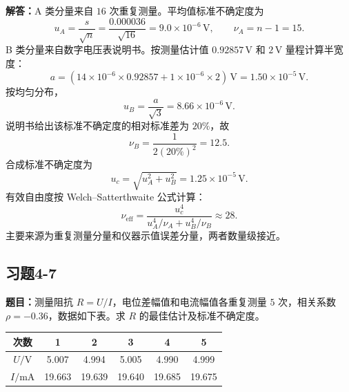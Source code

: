 \documentclass[UTF8,zihao=-4]{ctexart}
\newcommand{\problem}[1]{\subsection*{#1}}
\newcommand{\timu}{\noindent\textbf{题目：}}
\newcommand{\jieda}{\noindent\textbf{解答：}}
\begin{document}
{\jieda A 类分量来自 $16$ 次重复测量。平均值标准不确定度为
\begin{equation*}
    u_A=\frac{s}{\sqrt n}=\frac{0.000036}{\sqrt{16}}=9.0\times10^{-6}\,\mathrm{V},
    \qquad \nu_A=n-1=15.
\end{equation*}
B 类分量来自数字电压表说明书。按测量估计值 $0.92857\,\mathrm{V}$ 和 $2\,\mathrm{V}$ 量程计算半宽度：
\begin{equation*}
    a=(14\times10^{-6}\times0.92857+1\times10^{-6}\times2)\,\mathrm{V}
    =1.50\times10^{-5}\,\mathrm{V}.
\end{equation*}
按均匀分布，
\begin{equation*}
    u_B=\frac{a}{\sqrt3}=8.66\times10^{-6}\,\mathrm{V}.
\end{equation*}
说明书给出该标准不确定度的相对标准差为 $20\%$，故
\begin{equation*}
    \nu_B=\frac{1}{2(20\%)^2}=12.5.
\end{equation*}
合成标准不确定度为
\begin{equation*}
    u_c=\sqrt{u_A^2+u_B^2}=1.25\times10^{-5}\,\mathrm{V}.
\end{equation*}
有效自由度按 Welch--Satterthwaite 公式计算：
\begin{equation*}
    \nu_{\mathrm{eff}}=\frac{u_c^4}{u_A^4/\nu_A+u_B^4/\nu_B}\approx28.
\end{equation*}
主要来源为重复测量分量和仪器示值误差分量，两者数量级接近。

\problem{习题4-7}
\timu 测量阻抗 $R=U/I$，电位差幅值和电流幅值各重复测量 $5$ 次，相关系数 $\rho=-0.36$，数据如下表。求 $R$ 的最佳估计及标准不确定度。

\begin{center}
\small
\begin{tabular}{c|ccccc}
\toprule
次数 & 1 & 2 & 3 & 4 & 5\\
\midrule
$U/\mathrm{V}$ & 5.007 & 4.994 & 5.005 & 4.990 & 4.999\\
$I/\mathrm{mA}$ & 19.663 & 19.639 & 19.640 & 19.685 & 19.675\\
\bottomrule
\end{tabular}
\end{center}

}
\end{document}
